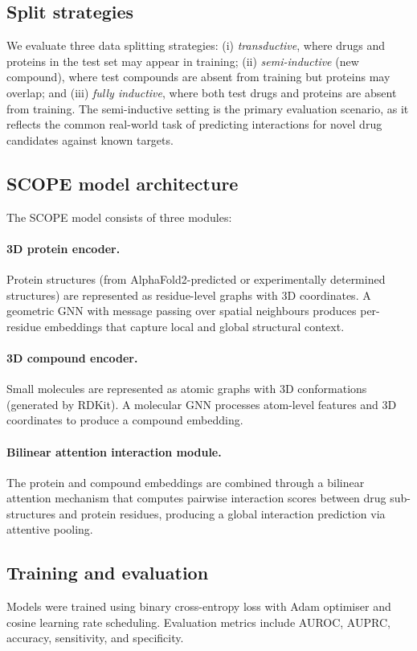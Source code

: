 \documentclass[11pt]{article}
\begin{document}
\subsection{Split strategies}
We evaluate three data splitting strategies: (i) \textit{transductive}, where drugs and proteins in the test set may appear in training; (ii) \textit{semi-inductive} (new compound), where test compounds are absent from training but proteins may overlap; and (iii) \textit{fully inductive}, where both test drugs and proteins are absent from training. The semi-inductive setting is the primary evaluation scenario, as it reflects the common real-world task of predicting interactions for novel drug candidates against known targets.

\subsection{SCOPE model architecture}
The SCOPE model consists of three modules:

\paragraph{3D protein encoder.} Protein structures (from AlphaFold2-predicted or experimentally determined structures) are represented as residue-level graphs with 3D coordinates. A geometric GNN with message passing over spatial neighbours produces per-residue embeddings that capture local and global structural context.

\paragraph{3D compound encoder.} Small molecules are represented as atomic graphs with 3D conformations (generated by RDKit). A molecular GNN processes atom-level features and 3D coordinates to produce a compound embedding.

\paragraph{Bilinear attention interaction module.} The protein and compound embeddings are combined through a bilinear attention mechanism that computes pairwise interaction scores between drug sub-structures and protein residues, producing a global interaction prediction via attentive pooling.

\subsection{Training and evaluation}
Models were trained using binary cross-entropy loss with Adam optimiser and cosine learning rate scheduling. Evaluation metrics include AUROC, AUPRC, accuracy, sensitivity, and specificity.
\end{document}

